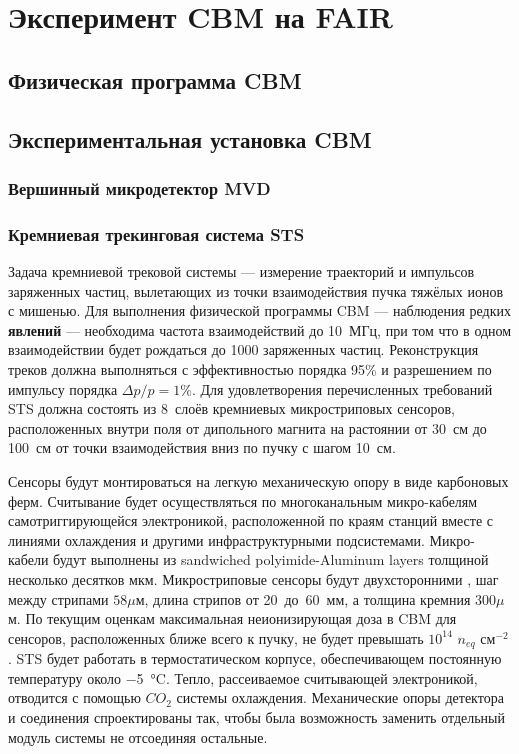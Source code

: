\chapter{Эксперимент CBM на FAIR}\label{sec:secCbm}

\section{Физическая программа CBM}

\section{Экспериментальная установка CBM}\label{sec:secCbmSetup}

\subsection{Вершинный микродетектор MVD}\label{sec:secMVD}



\subsection{Кремниевая трекинговая система STS}\label{sec:secSTS}

Задача кремниевой трековой системы --- измерение траекторий и импульсов заряженных частиц, вылетающих из точки взаимодействия пучка тяжёлых ионов с мишенью. Для выполнения физической программы CBM --- наблюдения редких \textbf{явлений} --- необходима частота взаимодействий до 10~МГц, при том что в одном взаимодействии будет рождаться до 1000 заряженных частиц. Реконструкция треков должна выполняться с эффективностью порядка 95\% и разрешением по импульсу порядка $\Delta p / p = 1\%$. Для удовлетворения перечисленных требований STS должна состоять из 8~слоёв кремниевых микростриповых сенсоров, расположенных внутри поля от дипольного магнита на растоянии от 30~см до 100~см от точки взаимодействия вниз по пучку с шагом 10~см.

Сенсоры будут монтироваться на легкую механическую опору в виде карбоновых ферм. Считывание будет осуществляться по многоканальным микро-кабелям самотриггирующейся электроникой, расположенной по краям станций вместе с линиями охлаждения и другими инфраструктурными подсистемами. Микро-кабели будут выполнены из sandwiched polyimide-Aluminum layers толщиной несколько десятков мкм.
Микростриповые сенсоры будут двухсторонними \todo, шаг между стрипами $58 \mu$м, длина стрипов от 20~до~60~мм, а толщина кремния $300 \mu$м. По текущим оценкам максимальная неионизирующая доза в CBM для сенсоров, расположенных ближе всего к пучку, не будет превышать $10^{14}$ $n_{eq}$ см$^{-2}$. STS будет работать в термостатическом корпусе, обеспечивающем постоянную температуру около \SI{-5}{\degreeCelsius}. Тепло, рассеиваемое считывающей электроникой, отводится с помощью $CO_{2}$ системы охлаждения. Механические опоры детектора и соединения спроектированы так, чтобы была возможность заменить отдельный модуль системы не отсоединяя остальные.

